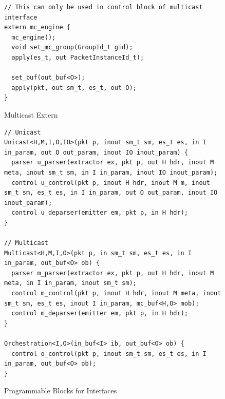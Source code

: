 \begin{figure}[h]
\begin{lstlisting}[frame=none]
// This can only be used in control block of multicast interface
extern mc_engine {
  mc_engine();
  void set_mc_group(GroupId_t gid);
  apply(es_t, out PacketInstanceId_t);
  
  set_buf(out_buf<O>);
  apply(pkt, out sm_t, es_t, out O);  
}
\end{lstlisting}
\caption{Multicast Extern}
\label{fig:msa-multicast-extern}
\end{figure}


\begin{figure}[h]
\begin{lstlisting}[frame=none]
// Unicast
Unicast<H,M,I,O,IO>(pkt p, inout sm_t sm, es_t es, in I in_param, out O out_param, inout IO inout_param) {
  parser u_parser(extractor ex, pkt p, out H hdr, inout M meta, inout sm_t sm, in I in_param, inout IO inout_param);
  control u_control(pkt p, inout H hdr, inout M m, inout sm_t sm, es_t es, in I in_param, out O out_param, inout IO inout_param);
  control u_deparser(emitter em, pkt p, in H hdr);                             
}

// Multicast
Multicast<H,M,I,O>(pkt p, in sm_t sm, es_t es, in I in_param, out_buf<O> ob) {
  parser m_parser(extractor ex, pkt p, out H hdr, inout M meta, in I in_param, inout sm_t sm);
  control m_control(pkt p, inout H hdr, inout M meta, inout sm_t sm, es_t es, inout I in_param, mc_buf<H,O> mob);
  control m_deparser(emitter em, pkt p, in H hdr);
}

Orchestration<I,O>(in_buf<I> ib, out_buf<O> ob) {                         
  control o_control(pkt p, inout sm_t sm, es_t es, in I in_param, out_buf<O> ob);
}    
\end{lstlisting}
\caption{Programmable Blocks for Interfaces}
\label{fig:programmable-blocks-for-interfaces}
\end{figure}






